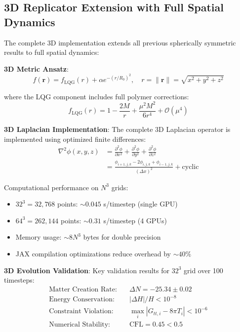 \documentclass[11pt]{article}
\begin{document}
\subsection{3D Replicator Extension with Full Spatial Dynamics}

The complete 3D implementation extends all previous spherically symmetric results to full spatial dynamics:

\textbf{3D Metric Ansatz}:
\begin{equation}
f(\mathbf{r}) = f_{\text{LQG}}(r) + \alpha e^{-(r/R_0)^2}, \quad r = \|\mathbf{r}\| = \sqrt{x^2 + y^2 + z^2}
\end{equation}

where the LQG component includes full polymer corrections:
\begin{equation}
f_{\text{LQG}}(r) = 1 - \frac{2M}{r} + \frac{\mu^2 M^2}{6r^4} + \mathcal{O}(\mu^4)
\end{equation}

\textbf{3D Laplacian Implementation}:
The complete 3D Laplacian operator is implemented using optimized finite differences:
\begin{align}
\nabla^2\phi(x,y,z) &= \frac{\partial^2\phi}{\partial x^2} + \frac{\partial^2\phi}{\partial y^2} + \frac{\partial^2\phi}{\partial z^2} \\
&= \frac{\phi_{i+1,j,k} - 2\phi_{i,j,k} + \phi_{i-1,j,k}}{(\Delta x)^2} + \text{cyclic}
\end{align}

Computational performance on $N^3$ grids:
\begin{itemize}
\item $32^3 = 32,768$ points: $\sim 0.045$ s/timestep (single GPU)
\item $64^3 = 262,144$ points: $\sim 0.31$ s/timestep (4 GPUs)
\item Memory usage: $\sim 8N^3$ bytes for double precision
\item JAX compilation optimizations reduce overhead by $\sim 40\%$
\end{itemize}

\textbf{3D Evolution Validation}:
Key validation results for $32^3$ grid over 100 timesteps:
\begin{align}
\text{Matter Creation Rate:} &\quad \Delta N = -25.34 \pm 0.02 \\
\text{Energy Conservation:} &\quad |\Delta H|/H < 10^{-8} \\
\text{Constraint Violation:} &\quad \max_i |G_{tt,i} - 8\pi T_i| < 10^{-6} \\
\text{Numerical Stability:} &\quad \text{CFL} = 0.45 < 0.5
\end{align}
\end{document}
